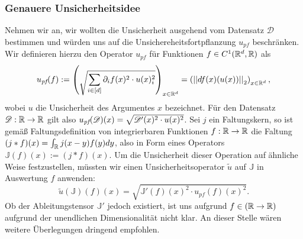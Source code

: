 \documentclass[../../main.tex]{subfiles}
\begin{document}
    \subsubsection*{Genauere Unsicherheitsidee}
        Nehmen wir an, wir wollten die Unsicherheit ausgehend vom Datensatz $\mathcal{D}$ bestimmen und würden uns auf die Unsichereheitsfortpflanzung $u_{\textit{pf}}$ beschränken. Wir definieren hierzu den Operator $u_{\textit{pf}}$ für Funktionen $f\in C^1(\mathbb{R}^d,\mathbb{R})$ als 
        \[
            u_{\textit{pf}}(f) := \left(
                \sqrt{
                    \sum_{i\in [d]}\partial_if(x)^2\cdot u(x)_i^2
                }
            \right)_{x\in\mathbb{R}^d} = \left(\abs{\abs{df(x)(u(x))}}_{2}\right)_{x\in\mathbb{R}^d},
        \]
        wobei $u$ die Unsicherheit des Argumentes $x$ bezeichnet. Für den Datensatz $\mathcal{D}:\mathbb{R}\to\mathbb{R}$ gilt also $u_{\textit{pf}}(\mathcal D)(x) = \sqrt{\mathcal{D}'(x)^2\cdot u(x)^2}$. Sei $j$ ein Faltungskern, so ist gemäß Faltungsdefinition von integrierbaren Funktionen $f:\mathbb{R}\to\mathbb{R}$ die Faltung $(j\ast f)(x) = \int_{\mathbb{R}}j(x-y)f(y)dy$, also in Form eines Operators $\mathbb{J}(f)(x) := (j\ast f)(x)$. Um die Unsicherheit dieser Operation auf ähnliche Weise festzustellen, müssten wir einen Unsicherheitsoperator $\tilde u$ auf $\mathbb{J}$ in Auswertung $f$ anwenden:
        \[
            \tilde u(\mathbb{J})(f)(x) = \sqrt{\mathbb{J}'(f)(x)^2\cdot u_{pf}(f)(x)^2}.
        \]
        Ob der Ableitungstensor $\mathbb{J}'$ jedoch existiert, ist uns aufgrund $f\in (\mathbb{R}\to\mathbb{R})$ aufgrund der unendlichen Dimensionalität nicht klar. An dieser Stelle wären weitere Überlegungen dringend empfohlen. 
\end{document}
